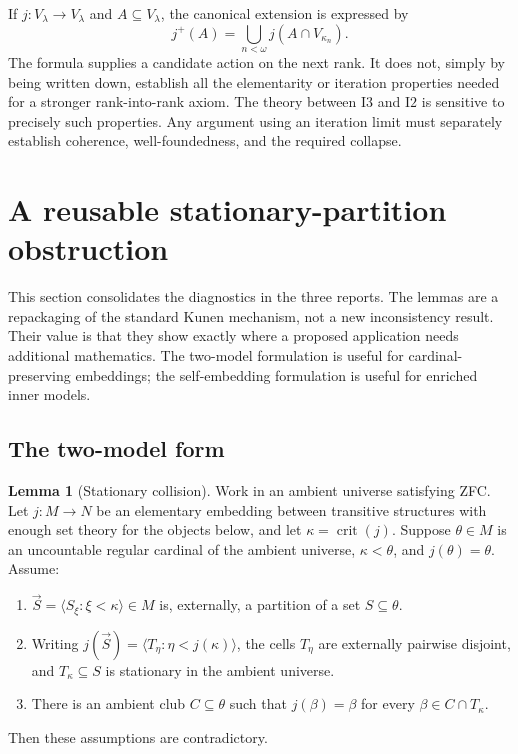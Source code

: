 \documentclass[11pt,letterpaper]{article}
\theoremstyle{definition}
\newtheorem{lemma}[definition]{Lemma}
\newcommand{\crit}{\operatorname{crit}}
\newcommand{\Itwo}{\mathrm{I2}}
\newcommand{\Ithree}{\mathrm{I3}}
\begin{document}
If $j:V_\lambda\to V_\lambda$ and $A\subseteq V_\lambda$, the canonical extension is expressed by
\[
 j^+(A)=\bigcup_{n<\omega}j(A\cap V_{\kappa_n}).
\]
The formula supplies a candidate action on the next rank. It does not, simply by being written down, establish all the elementarity or iteration properties needed for a stronger rank-into-rank axiom. The theory between $\Ithree$ and $\Itwo$ is sensitive to precisely such properties. Any argument using an iteration limit must separately establish coherence, well-foundedness, and the required collapse. \cite{dimonte,iterability}

\section{A reusable stationary-partition obstruction}\label{sec:obstruction}

This section consolidates the diagnostics in the three reports. The lemmas are a repackaging of the standard Kunen mechanism, not a new inconsistency result. Their value is that they show exactly where a proposed application needs additional mathematics. The two-model formulation is useful for cardinal-preserving embeddings; the self-embedding formulation is useful for enriched inner models. \cite{kunen,hkp}

\subsection{The two-model form}

\begin{lemma}[Stationary collision]\label{lem:collision}
Work in an ambient universe satisfying ZFC. Let $j:M\to N$ be an elementary embedding between transitive structures with enough set theory for the objects below, and let $\kappa=\crit(j)$. Suppose $\theta\in M$ is an uncountable regular cardinal of the ambient universe, $\kappa<\theta$, and $j(\theta)=\theta$. Assume:
\begin{enumerate}
\item $\vec S=\langle S_\xi:\xi<\kappa\rangle\in M$ is, externally, a partition of a set $S\subseteq\theta$.
\item Writing $j(\vec S)=\langle T_\eta:\eta<j(\kappa)\rangle$, the cells $T_\eta$ are externally pairwise disjoint, and $T_\kappa\subseteq S$ is stationary in the ambient universe.
\item There is an ambient club $C\subseteq\theta$ such that $j(\beta)=\beta$ for every $\beta\in C\cap T_\kappa$.
\end{enumerate}
Then these assumptions are contradictory.
\end{lemma}
\end{document}
